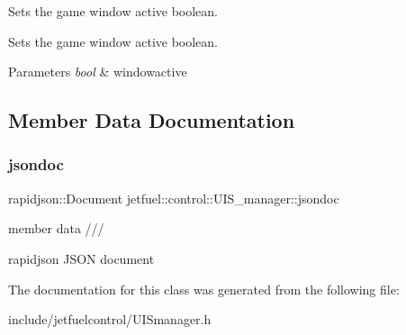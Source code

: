 Sets the game window active boolean. 

Sets the game window active boolean.


\begin{DoxyParams}{Parameters}
{\em bool} & windowactive \\
\hline
\end{DoxyParams}


\subsection{Member Data Documentation}
\mbox{\label{classjetfuel_1_1control_1_1UIS__manager_a83099ccbf9449bf3a3a27d7c7b9b1ff5}} 
\subsubsection{\texorpdfstring{jsondoc}{jsondoc}}
{\footnotesize\ttfamily rapidjson\+::\+Document jetfuel\+::control\+::\+U\+I\+S\+\_\+manager\+::jsondoc\hspace{0.3cm}{\ttfamily [protected]}}



member data /// 

rapidjson J\+S\+ON document 

The documentation for this class was generated from the following file\+:\begin{DoxyCompactItemize}
\item 
include/jetfuelcontrol/U\+I\+Smanager.\+h\end{DoxyCompactItemize}
